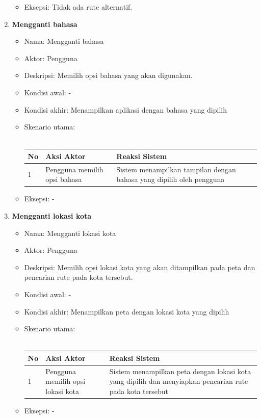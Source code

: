 \begin{enumerate}
\begin{itemize}
\begin{tabular}{|p{0.5cm} |p{6cm}| p{6cm}|}
						\end{tabular} 
			\item Eksepsi: Tidak ada rute alternatif.
		\end{itemize}
	\item \textbf{Mengganti bahasa}
	\begin{itemize}
			\item Nama: Mengganti bahasa
			\item Aktor: Pengguna
			\item Deskripsi: Memilih opsi bahasa yang akan digunakan.
			\item Kondisi awal: -
			\item Kondisi akhir: Menampilkan aplikasi dengan bahasa yang dipilih
			\item Skenario utama: \\ \\
				\begin{tabular}{|p{0.5cm} |p{6cm}| p{6cm}|}
						\hline
							No 	& Aksi Aktor & Reaksi Sistem \\ \hline
							1 	& Pengguna memilih opsi bahasa 	&	Sistem menampilkan tampilan dengan bahasa yang dipilih oleh pengguna \\ \hline 
						\end{tabular} 
			\item Eksepsi: -
		\end{itemize}
	\item \textbf{Mengganti lokasi kota}
	\begin{itemize}
			\item Nama: Mengganti lokasi kota
			\item Aktor: Pengguna
			\item Deskripsi: Memilih opsi lokasi kota yang akan ditampilkan pada peta dan pencarian rute pada kota tersebut.
			\item Kondisi awal: -
			\item Kondisi akhir: Menampilkan peta dengan lokasi kota yang dipilih
			\item Skenario utama: \\ \\
				\begin{tabular}{|p{0.5cm} |p{6cm}| p{6cm}|}
						\hline
							No 	& Aksi Aktor & Reaksi Sistem \\ \hline
							1 	& Pengguna memilih opsi lokasi kota 	&	Sistem menampilkan peta dengan lokasi kota yang dipilih dan menyiapkan pencarian rute pada kota tersebut \\ \hline 
						\end{tabular} 
			\item Eksepsi: -
		\end{itemize}
\end{enumerate}


